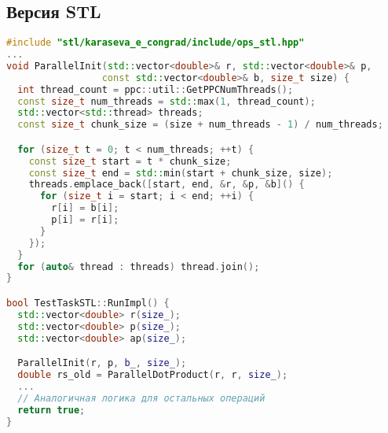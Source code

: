 \documentclass[12pt]{article}
\begin{document}
\subsection{Версия STL}
\begin{lstlisting}[language=C++]
#include "stl/karaseva_e_congrad/include/ops_stl.hpp"
...
void ParallelInit(std::vector<double>& r, std::vector<double>& p, 
                 const std::vector<double>& b, size_t size) {
  int thread_count = ppc::util::GetPPCNumThreads();
  const size_t num_threads = std::max(1, thread_count);
  std::vector<std::thread> threads;
  const size_t chunk_size = (size + num_threads - 1) / num_threads;

  for (size_t t = 0; t < num_threads; ++t) {
    const size_t start = t * chunk_size;
    const size_t end = std::min(start + chunk_size, size);
    threads.emplace_back([start, end, &r, &p, &b]() {
      for (size_t i = start; i < end; ++i) {
        r[i] = b[i];
        p[i] = r[i];
      }
    });
  }
  for (auto& thread : threads) thread.join();
}

bool TestTaskSTL::RunImpl() {
  std::vector<double> r(size_);
  std::vector<double> p(size_);
  std::vector<double> ap(size_);

  ParallelInit(r, p, b_, size_);
  double rs_old = ParallelDotProduct(r, r, size_);
  ...
  // Аналогичная логика для остальных операций
  return true;
}
\end{lstlisting}
\end{document}
